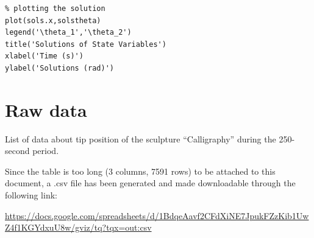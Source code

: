 \documentclass[a4paper,12pt]{article}
\begin{document}
\begin{appendices}
\begin{verbatim}
% plotting the solution
plot(sols.x,solstheta)
legend('\theta_1','\theta_2')
title('Solutions of State Variables')
xlabel('Time (s)')
ylabel('Solutions (rad)')
        \end{verbatim}
    \section{Raw data}
        List of data about tip position of the sculpture “Calligraphy” during the 250-second period.

        Since the table is too long (3 columns, 7591 rows) to be attached to this document, a .csv file has been generated and made downloadable through the following link:

        \url{https://docs.google.com/spreadsheets/d/1BdqeAavf2CFdXiNE7JpukFZzKib1UwZ4f1KGYdxuU8w/gviz/tq?tqx=out:csv}
\end{appendices}
\end{document}
